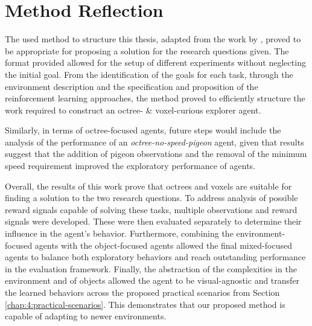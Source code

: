         
    
    
    
  

\section{Method Reflection}\label{sec:method-reflection}
    
    The used method to structure this thesis, adapted from the work by \cite{luckert2016using}, proved to be appropriate for proposing a solution for the research questions given. The format provided allowed for the setup of different experiments without neglecting the initial goal. From the identification of the goals for each task, through the environment description and the specification and proposition of the reinforcement learning approaches, the method proved to efficiently structure the work required to construct an octree- & voxel-curious explorer agent.

    Similarly, in terms of octree-focused agents, future steps would include the analysis of the performance of an \textit{octree-no-speed-pigeon} agent, given that results suggest that the addition of pigeon observations and the removal of the minimum speed requirement improved the exploratory performance of agents.

    Overall, the results of this work prove that octrees and voxels are suitable for finding a solution to the two research questions. To address analysis of possible reward signals capable of solving these tasks, multiple observations and reward signals were developed. These were then evaluated separately to determine their influence in the agent's behavior. Furthermore, combining the environment-focused agents with the object-focused agents allowed the final mixed-focused agents to balance both exploratory behaviors and reach outstanding performance in the evaluation framework. Finally, the abstraction of the complexities in the environment and of objects allowed the agent to be visual-agnostic and transfer the learned behaviors across the proposed practical scenarios from Section \ref{chap:4:practical-scenarios}. This demonstrates that our proposed method is capable of adapting to newer environments. 
    
